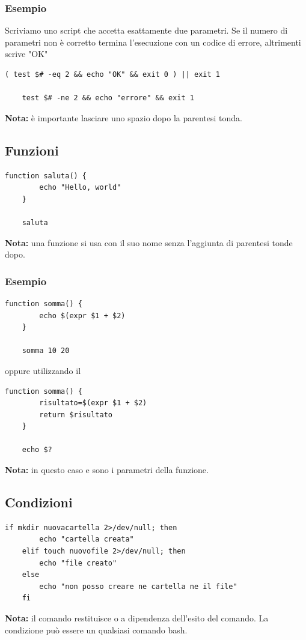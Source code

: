 \documentclass[../main.tex]{subfiles}
\begin{document}
\vspace{0.25cm}
\subsubsection{Esempio}
Scriviamo uno script che accetta esattamente due parametri. Se il numero di parametri non è corretto termina l'esecuzione con un codice 
di errore, altrimenti scrive "OK"
\begin{lstlisting}[style=bash]
    ( test $# -eq 2 && echo "OK" && exit 0 ) || exit 1

    test $# -ne 2 && echo "errore" && exit 1
\end{lstlisting}
\textbf{Nota:} è importante lasciare uno spazio dopo la parentesi tonda.

\pagebreak
\subsection{Funzioni}
\begin{lstlisting}[style=bash]
    function saluta() {
        echo "Hello, world"
    }

    saluta
\end{lstlisting}
\textbf{Nota:} una funzione si usa con il suo nome senza l'aggiunta di parentesi tonde dopo.

\vspace{0.25cm}
\subsubsection{Esempio}
\begin{lstlisting}[style=bash]
    function somma() {
        echo $(expr $1 + $2)
    }

    somma 10 20
\end{lstlisting}

oppure utilizzando il 

\begin{lstlisting}[style=bash]
    function somma() {
        risultato=$(expr $1 + $2)
        return $risultato
    }

    echo $?
\end{lstlisting}
\textbf{Nota:} in questo caso  e  sono i parametri della funzione.

\vspace{1cm}
\subsection{Condizioni}
\begin{lstlisting}[style=bash]
    if mkdir nuovacartella 2>/dev/null; then
        echo "cartella creata"
    elif touch nuovofile 2>/dev/null; then
        echo "file creato"
    else
        echo "non posso creare ne cartella ne il file"
    fi
\end{lstlisting}
\textbf{Nota:} il comando  restituisce  o  a dipendenza dell'esito del comando. La condizione
può essere un qualsiasi comando bash.
\end{document}
